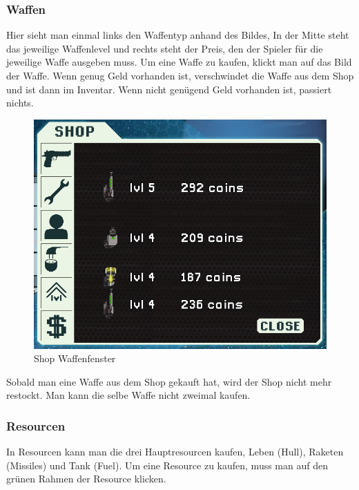 \documentclass[fontsize=12pt,paper=a4,twoside]{scrartcl}
\begin{document}
\subsubsection{Waffen}

Hier sieht man einmal links den Waffentyp anhand des Bildes, In der Mitte steht das jeweilige Waffenlevel und rechts steht der Preis, den der Spieler für die jeweilige Waffe ausgeben muss. Um eine Waffe zu kaufen, klickt man auf das Bild der Waffe. Wenn genug Geld vorhanden ist, verschwindet die Waffe aus dem Shop und ist dann im Inventar. Wenn nicht genügend Geld vorhanden ist, passiert nichts. 

\begin{figure}[H]
\centering
\includegraphics[width=1\linewidth]{DasSpiel/Shop/waffen.png}
\caption{Shop Waffenfenster}
\end{figure}

Sobald man eine Waffe aus dem Shop gekauft hat, wird der Shop nicht mehr restockt. Man kann die selbe Waffe nicht zweimal kaufen. 

\subsubsection{Resourcen}

In Resourcen kann man die drei Hauptresourcen kaufen, Leben (Hull), Raketen (Missiles) und Tank (Fuel). Um eine Resource zu kaufen, muss man auf den grünen Rahmen der Resource klicken. 
\end{document}
